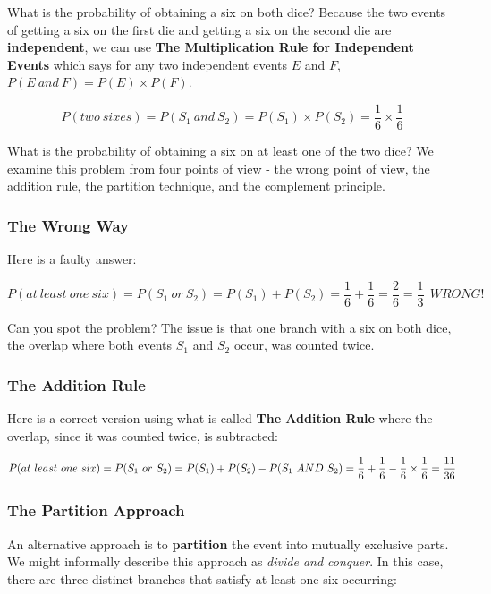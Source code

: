 \documentclass[]{book}
\theoremstyle{definition}
\theoremstyle{definition}
\theoremstyle{definition}
\theoremstyle{remark}
\begin{document}
What is the probability of obtaining a six on both dice? Because the two
events of getting a six on the first die and getting a six on the second
die are \textbf{independent}, we can use \textbf{The Multiplication Rule
for Independent Events} which says for any two independent events \(E\)
and \(F\), \(P(E\ and\ F) = P(E) \times P(F)\).

\[P(two\ sixes) = P(S_{1}\ and\ S_{2}) = P(S_{1}) \times P(S_{2}) =  \frac{1}{6} \times \frac{1}{6}\]

What is the probability of obtaining a six on at least one of the two
dice? We examine this problem from four points of view - the wrong point
of view, the addition rule, the partition technique, and the complement
principle.

\subsubsection{The Wrong Way}\label{the-wrong-way}

Here is a faulty answer:

\[P(at\ least\ one\ six) = P(S_{1}\ or\ S_{2}) = P(S_{1})+ P(S_{2}) = \frac{1}{6} + \frac{1}{6} = \frac{2}{6} = \frac{1}{3}\ \ WRONG!\]

Can you spot the problem? The issue is that one branch with a six on
both dice, the overlap where both events \(S_{1}\) and \(S_{2}\) occur,
was counted twice.

\subsubsection{The Addition Rule}\label{the-addition-rule}

Here is a correct version using what is called \textbf{The Addition
Rule} where the overlap, since it was counted twice, is subtracted:

\[P(at\ least\ one\ six) = P(S_{1}\ or\ S_{2}) = P(S_{1})+ P(S_{2}) - P(S_{1}\ AND\ S_{2}) =\\ \frac{1}{6} + \frac{1}{6} - \frac{1}{6} \times \frac{1}{6}  = \frac{11}{36}\]

\subsubsection{The Partition Approach}\label{the-partition-approach}

An alternative approach is to \textbf{partition} the event into mutually
exclusive parts. We might informally describe this approach as
\emph{divide and conquer}. In this case, there are three distinct
branches that satisfy at least one six occurring:
\end{document}
